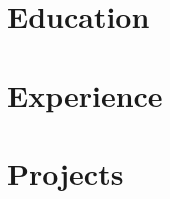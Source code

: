 \documentclass[letter,10pt]{article}
\begin{document}
%
\section{Education}

\section{Experience}


\section{Projects}

%

%
\end{document}
